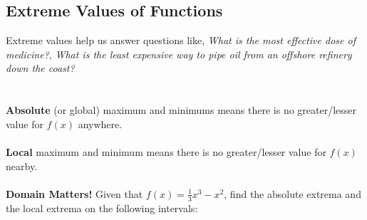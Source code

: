 \subsection*{Extreme Values of Functions}
Extreme values help us answer questions like, \textit{What is the most effective dose of medicine?}, \textit{What is the least expensive way to pipe oil from an offshore refinery down the coast?}\\
\\
\\

\textbf{Absolute} (or global) maximum and minimums means there is no greater/lesser value for $f(x)$ anywhere.\\
\\
\textbf{Local} maximum and minimum means there is no greater/lesser value for $f(x)$ nearby.\\
\\
\textbf{Domain Matters!} Given that $\displaystyle f(x)=\frac{1}{3}x^3-x^2$, find the absolute extrema and the local extrema on the following intervals:

